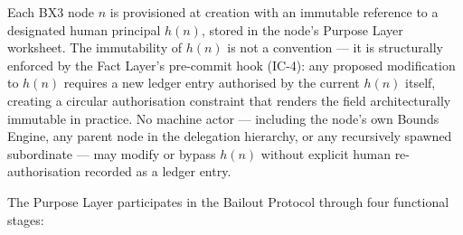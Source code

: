 Each BX3 node $n$ is provisioned at creation with an immutable reference to a designated human principal $h(n)$, stored in the node's Purpose Layer worksheet. The immutability of $h(n)$ is not a convention — it is structurally enforced by the Fact Layer's pre-commit hook (IC-4): any proposed modification to $h(n)$ requires a new ledger entry authorised by the current $h(n)$ itself, creating a circular authorisation constraint that renders the field architecturally immutable in practice. No machine actor — including the node's own Bounds Engine, any parent node in the delegation hierarchy, or any recursively spawned subordinate — may modify or bypass $h(n)$ without explicit human re-authorisation recorded as a ledger entry.

The Purpose Layer participates in the Bailout Protocol through four functional stages:

